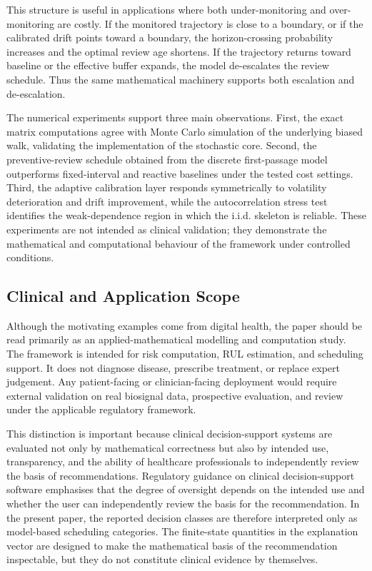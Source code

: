 \documentclass[pdflatex,sn-mathphys-num]{sn-jnl}
\theoremstyle{definition}
\numberwithin{equation}{section}
\begin{document}
This structure is useful in applications where both under-monitoring and
over-monitoring are costly. If the monitored trajectory is close to a boundary,
or if the calibrated drift points toward a boundary, the horizon-crossing
probability increases and the optimal review age shortens. If the trajectory
returns toward baseline or the effective buffer expands, the model de-escalates
the review schedule. Thus the same mathematical machinery supports both
escalation and de-escalation.

The numerical experiments support three main observations. First, the exact
matrix computations agree with Monte Carlo simulation of the underlying biased
walk, validating the implementation of the stochastic core. Second, the
preventive-review schedule obtained from the discrete first-passage model
outperforms fixed-interval and reactive baselines under the tested cost
settings. Third, the adaptive calibration layer responds symmetrically to
volatility deterioration and drift improvement, while the autocorrelation
stress test identifies the weak-dependence region in which the i.i.d. skeleton
is reliable. These experiments are not intended as clinical validation; they
demonstrate the mathematical and computational behaviour of the framework under
controlled conditions.

\subsection*{Clinical and Application Scope}

Although the motivating examples come from digital health, the paper should be
read primarily as an applied-mathematical modelling and computation study. The
framework is intended for risk computation, RUL estimation, and scheduling
support. It does not diagnose disease, prescribe treatment, or replace expert
judgement. Any patient-facing or clinician-facing deployment would require
external validation on real biosignal data, prospective evaluation, and review
under the applicable regulatory framework.

This distinction is important because clinical decision-support systems are
evaluated not only by mathematical correctness but also by intended use,
transparency, and the ability of healthcare professionals to independently
review the basis of recommendations. Regulatory guidance on clinical
decision-support software emphasises that the degree of oversight depends on
the intended use and whether the user can independently review the basis for
the recommendation. In the present paper, the
reported decision classes are therefore interpreted only as model-based
scheduling categories. The finite-state quantities in the explanation vector
are designed to make the mathematical basis of the recommendation inspectable,
but they do not constitute clinical evidence by themselves.
\end{document}
